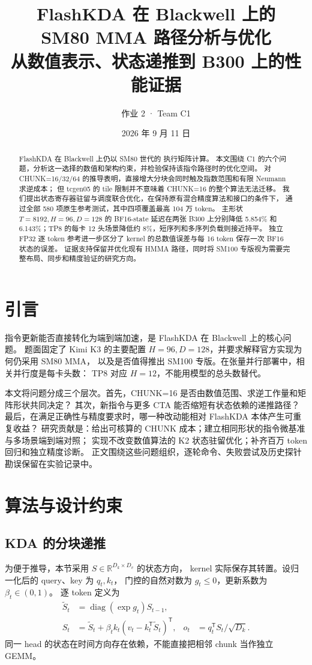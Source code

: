 \documentclass[11pt,a4paper,fontset=none]{ctexart}
\title{\bfseries FlashKDA 在 Blackwell 上的\\SM80 MMA 路径分析与优化\\
  \large 从数值表示、状态递推到 B300 上的性能证据}
\author{作业 2 · Team C1}
\date{2026 年 9 月 11 日}
\newcommand{\code}[1]{\texttt{\detokenize{#1}}}
\begin{document}
\maketitle
\begin{abstract}
FlashKDA 在 Blackwell 上仍以 SM80 世代的 \code{mma.sync} 执行矩阵计算。
本文围绕 C1 的六个问题，分析这一选择的数值和架构约束，并检验保持该指令路径时的优化空间。
对 CHUNK=16/32/64 的推导表明，直接增大分块会同时触及指数范围和有限 Neumann 求逆成本；
但 tcgen05 的 tile 限制并不意味着 CHUNK=16 的整个算法无法迁移。
我们提出状态寄存器驻留与调度联合优化，在保持原有混合精度算法和接口的条件下，
通过全部 580 项原生参考测试，其中四项覆盖最高 104 万 token。
主形状 \(T=8192,H=96,D=128\) 的 BF16-state 延迟在两张 B300 上分别降低
5.854\% 和 6.143\%；TP8 的每卡 12 头场景降低约 8\%，短序列和多序列负载则接近持平。
独立 FP32 逐 token 参考进一步区分了 kernel 的总数值误差与每 16 token 保存一次 BF16 状态的误差。
证据支持保留并优化现有 HMMA 路径，同时将 SM100 专版视为需要完整布局、同步和精度验证的研究方向。
\end{abstract}

\section{引言}
指令更新能否直接转化为端到端加速，是 FlashKDA 在 Blackwell 上的核心问题。
题面固定了 Kimi K3 的主要配置 \(H=96,D=128\)，并要求解释官方实现为何仍采用 SM80 MMA，
以及是否值得推出 SM100 专版\cite{task}。在张量并行部署中，相关并行度是每卡头数：
TP8 对应 \(H=12\)，不能用模型的总头数替代。

本文将问题分成三个层次。首先，CHUNK=16 是否由数值范围、求逆工作量和矩阵形状共同决定？
其次，新指令与更多 CTA 能否缩短有状态依赖的递推路径？
最后，在满足正确性与精度要求时，哪一种改动能相对 FlashKDA 本体产生可重复收益？
研究贡献是：给出可核算的 CHUNK 成本；建立相同形状的指令微基准与多场景端到端对照；
实现不改变数值算法的 K2 状态驻留优化；补齐百万 token 回归和独立精度诊断。
正文围绕这些问题组织，逐轮命令、失败尝试及历史探针勘误保留在实验记录中。

\section{算法与设计约束}
\subsection{KDA 的分块递推}
为便于推导，本节采用 \(S\in\mathbb{R}^{D_k\times D_v}\) 的状态方向，
kernel 实际保存其转置。设归一化后的 query、key 为 \(q_t,k_t\)，
门控的自然对数为 \(g_t\le0\)，更新系数为 \(\beta_t\in(0,1)\)。
逐 token 定义为\cite{fla}
\begin{align}
 \widetilde S_t&=\operatorname{diag}(\exp g_t)S_{t-1},\\
 S_t&=\widetilde S_t+
       \beta_t k_t(v_t-k_t^{\mathsf T}\widetilde S_t)^{\mathsf T},
 &o_t&=q_t^{\mathsf T}S_t/\sqrt{D_k}.
\end{align}
同一 head 的状态在时间方向存在依赖，不能直接把相邻 chunk 当作独立 GEMM。
\end{document}
